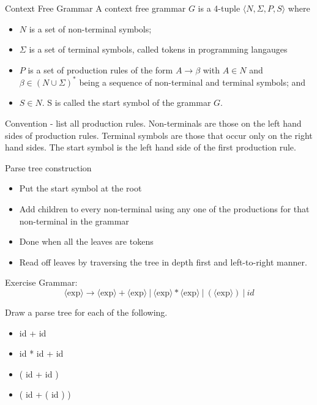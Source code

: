 \documentclass{beamer}
\newcommand{\nt}[1]{{\langle \mbox{#1}\rangle}}
\begin{document}
\begin{frame} {Context Free Grammar}
A context free grammar $G$ is a 4-tuple $\langle N, \Sigma, P, S\rangle$ where
\begin{itemize}
\item $N$ is a set of non-terminal symbols;
\item $\Sigma$ is a set of terminal symbols, called tokens in programming langauges
\item $P$ is a set of production rules of the form $A \rightarrow \beta$ with $A\in N$ and $\beta\in (N\cup\Sigma)^{*}$ being a sequence of non-terminal and terminal symbols; and
\item $S\in N$. S is called the start symbol of the grammar $G$.
\end{itemize}

\hfill

Convention - list all production rules. Non-terminals  are those on the left hand sides of production rules. Terminal symbols are those that occur only on the right hand sides. The start symbol is the left hand side of the first production rule.
\end{frame}

\begin{frame} {Parse tree construction}
\begin{itemize}
\item Put the start symbol at the root
\item
Add children to every non-terminal using any one of the productions for that non-terminal in the grammar
\item
Done when all the leaves are tokens
\item
Read off leaves by traversing the tree in depth first and left-to-right manner.
\end{itemize}
\end{frame}

\begin{frame} {Exercise}
Grammar:
\[ \nt{exp} \rightarrow \nt{exp}  + \nt{exp}  ~|~ \nt{exp}  * \nt{exp}  ~|~ ( \nt{exp}  ) ~|~ id \]

Draw a parse tree for each of the following.
\begin{itemize}
\item 		id + id
\item		id * id + id
\item		( id + id )
\item	( id + ( id ) )
\end{itemize}
\end{frame}
\end{document}
